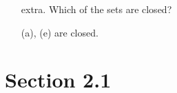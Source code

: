 \documentclass{article}
\DeclareMathOperator{\re}{Re}
\DeclareMathOperator{\im}{Im}
\begin{document}
\begin{itemize}
\begin{answer*}
			(c) Dotted boundary circle of radius 3 centered at $z=2,$ and a hole at $z=2.$
			
			(d) Solid boundary line at $\im z=1$ and dotted boundary line at $\im z=-1.$

			(e) Solid boundary circle of radius 2 centered at the origin.

			(f) Two dotted boundary lines at $\re z = 1$ and $\re z = -1.$

		\end{answer*}

	\item[extra.] Which of the sets are closed?
		\begin{answer*}
			(a), (e) are closed.
		\end{answer*}
		
\end{itemize}

\section*{Section 2.1}
\end{document}
